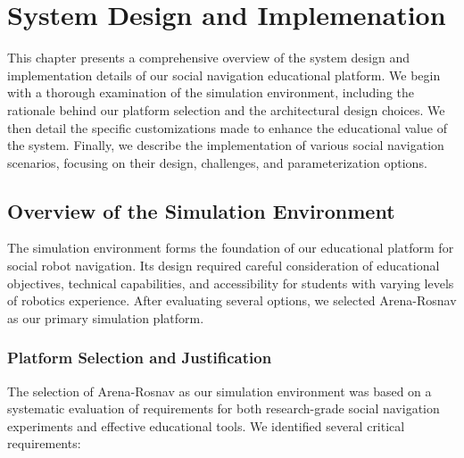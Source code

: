 
\chapter{System Design and Implemenation} %
This chapter presents a comprehensive overview of the system design and implementation details of 
our social navigation educational platform. We begin with a thorough examination of the simulation 
environment, including the rationale behind our platform selection and the architectural design 
choices. We then detail the specific customizations made to enhance the educational value of the 
system. Finally, we describe the implementation of various social navigation scenarios, focusing 
on their design, challenges, and parameterization options.

\label{Chapter3} %


\section{Overview of the Simulation Environment}

The simulation environment forms the foundation of our educational platform for social robot navigation. 
Its design required careful consideration of educational objectives, technical capabilities, and 
accessibility for students with varying levels of robotics experience. After evaluating several 
options, we selected Arena-Rosnav as our primary simulation platform.

\subsection{Platform Selection and Justification}
\label{sec:platform_selection_and_justification}

The selection of Arena-Rosnav as our simulation environment was based on a systematic evaluation of 
requirements for both research-grade social navigation experiments and effective educational tools. 
We identified several critical requirements:


